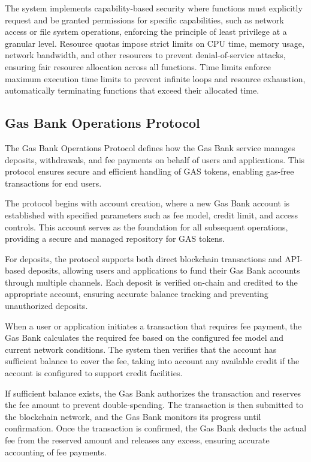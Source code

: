 \documentclass[12pt,a4paper]{article}
\begin{document}
The system implements capability-based security where functions must explicitly request and be granted permissions for specific capabilities, such as network access or file system operations, enforcing the principle of least privilege at a granular level. Resource quotas impose strict limits on CPU time, memory usage, network bandwidth, and other resources to prevent denial-of-service attacks, ensuring fair resource allocation across all functions. Time limits enforce maximum execution time limits to prevent infinite loops and resource exhaustion, automatically terminating functions that exceed their allocated time.

\subsection{Gas Bank Operations Protocol}
\label{subsec:gas-bank-protocol-spec}

The Gas Bank Operations Protocol defines how the Gas Bank service manages deposits, withdrawals, and fee payments on behalf of users and applications. This protocol ensures secure and efficient handling of GAS tokens, enabling gas-free transactions for end users.



The protocol begins with account creation, where a new Gas Bank account is established with specified parameters such as fee model, credit limit, and access controls. This account serves as the foundation for all subsequent operations, providing a secure and managed repository for GAS tokens.

For deposits, the protocol supports both direct blockchain transactions and API-based deposits, allowing users and applications to fund their Gas Bank accounts through multiple channels. Each deposit is verified on-chain and credited to the appropriate account, ensuring accurate balance tracking and preventing unauthorized deposits.

When a user or application initiates a transaction that requires fee payment, the Gas Bank calculates the required fee based on the configured fee model and current network conditions. The system then verifies that the account has sufficient balance to cover the fee, taking into account any available credit if the account is configured to support credit facilities.

If sufficient balance exists, the Gas Bank authorizes the transaction and reserves the fee amount to prevent double-spending. The transaction is then submitted to the blockchain network, and the Gas Bank monitors its progress until confirmation. Once the transaction is confirmed, the Gas Bank deducts the actual fee from the reserved amount and releases any excess, ensuring accurate accounting of fee payments.
\end{document}

